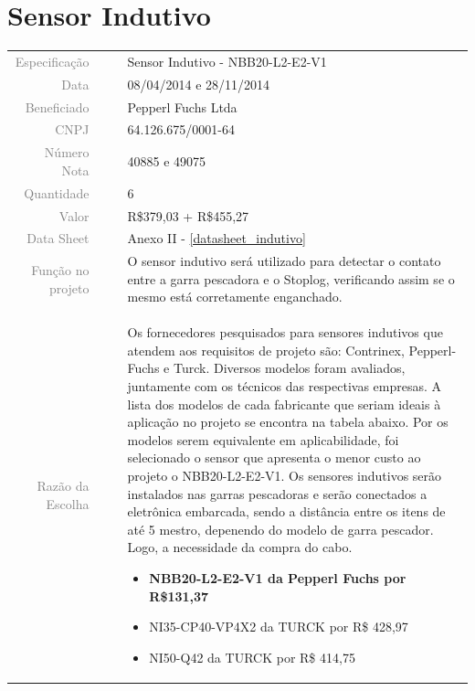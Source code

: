 

\section{Sensor Indutivo}
\label{indutivo}


\begin{table}[ht!]

	\begin{tabular}{r l|l p{12cm} }
		
		\textcolor{gray}{Especificação} &&& 	{Sensor Indutivo - NBB20-L2-E2-V1 }\\
		\textcolor{gray}{Data} &&& 				{08/04/2014 e 28/11/2014}\\
        \textcolor{gray}{Beneficiado} &&&		{Pepperl Fuchs Ltda} \\
        \textcolor{gray}{CNPJ} &&& 				{64.126.675/0001-64} \\
        \textcolor{gray}{Número Nota} &&& 		{40885 e 49075} \\
		\textcolor{gray}{Quantidade} &&& 		{6} \\
		\textcolor{gray}{Valor} &&& 			{R\$379,03 + R\$455,27} \\
		\textcolor{gray}{Data Sheet} &&& 		{Anexo II - \ref{datasheet_indutivo} } \\

		\textcolor{gray}{Função no projeto} &&& {O sensor indutivo será utilizado para detectar o contato entre a garra pescadora e o Stoplog, verificando assim se o mesmo está corretamente enganchado. } \\
		\textcolor{gray}{Razão da Escolha} &&& {Os fornecedores pesquisados para sensores indutivos que atendem aos requisitos de projeto são: Contrinex, Pepperl-Fuchs e Turck. Diversos modelos foram avaliados, juntamente com os técnicos das respectivas empresas. A lista dos modelos de cada fabricante que seriam ideais à aplicação no projeto se encontra na tabela abaixo. Por os modelos serem equivalente em aplicabilidade, foi selecionado o sensor que apresenta o menor custo ao projeto o NBB20-L2-E2-V1. Os sensores indutivos serão instalados nas garras pescadoras e serão conectados a eletrônica embarcada, sendo a distância entre os itens de até 5 mestro, depenendo do modelo de garra pescador. Logo, a necessidade da compra do cabo. 
		\begin{itemize}
		  \item \textbf {NBB20-L2-E2-V1 da Pepperl Fuchs  por R\$131,37}
		  \item NI35-CP40-VP4X2 da TURCK por R\$ 428,97 
		  \item NI50-Q42 da TURCK por R\$ 414,75
		\end{itemize}}
		

	\end{tabular}
\end{table}

